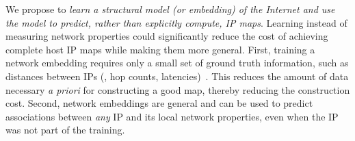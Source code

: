 We propose to {\em learn a structural model (or embedding) of the Internet and use the model to predict, rather than explicitly compute, IP maps}. Learning instead of measuring network properties could significantly reduce the cost of achieving complete host IP maps while making them more general. First, training a network embedding requires only a small set of ground truth information, such as distances between IPs (\eg{}, hop counts, latencies)~\citep{vivaldi,peerwise,barford-infocom}. This reduces the amount of data necessary {\em a priori} for constructing a good map, thereby reducing the construction cost. Second, network embeddings are general and can be used to predict associations between {\em any} IP and its local network properties, even when the IP was not part of the training. %











%

%
%
%



%

